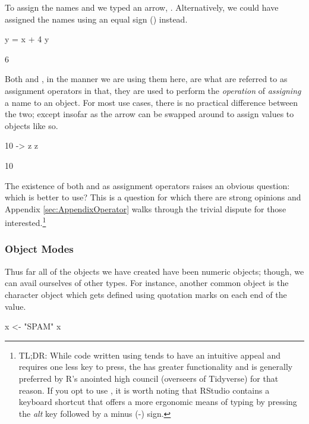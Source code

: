 To assign the names  and  we typed an arrow, \R{<-}. Alternatively, we could have assigned the names using an equal sign (\R{=}) instead.

\begin{inR}
y = x + 4
y
\end{inR}

\begin{outR}
[1] 6
\end{outR}

Both \R{<-} and \R{=}, in the manner we are using them here, are what are referred to as \glspl{assignment operator} in that, they are used to perform the \textit{operation} of \textit{assigning} a name to an object. For most use cases, there is no practical difference between the two; except insofar as the arrow can be swapped around to assign values to objects like so.

\begin{inR}
10 -> z
z
\end{inR}

\begin{outR}
[1] 10
\end{outR}

The existence of both \R{=} and \R{<-} as assignment operators raises an obvious question: which is better to use?  This is a question for which there are strong opinions and Appendix \ref{sec:AppendixOperator} walks through the trivial dispute for those interested.\footnote{TL;DR: While code written using \R{=} tends to have an intuitive appeal and requires one less key to press, the \R{<-} has greater functionality and is generally preferred by R's anointed high council (overseers of Tidyverse) for that reason. If you opt to use \R{<-}, it is worth noting that RStudio contains a keyboard shortcut that offers a more ergonomic means of typing \R{<-} by pressing the \textit{alt} key followed by a minus (-) sign.}

\subsubsection{Object Modes}
\label{sec:modes}

Thus far all of the objects we have created have been \gls{numeric} objects; though, we can avail ourselves of other types.  For instance, another common object is the \gls{character} object which gets defined using quotation marks on each end of the value.

\begin{inR}
x <- "SPAM"
x
\end{inR}


